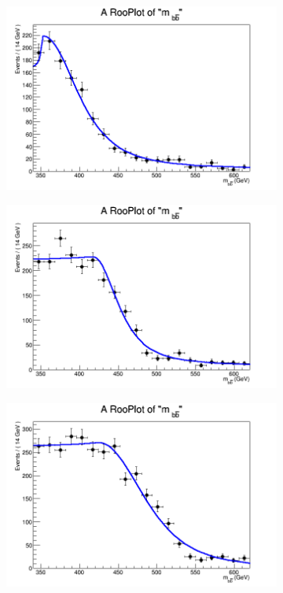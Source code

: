 \begin{figure}[phtb!]
  \begin{center}
  \begin{subfigure}[$m_{A}=400$ GeV]{0.4\textwidth}\includegraphics[width=\textwidth]{FitResults/images/fitMC_bAbb400_3.png}\end{subfigure}
  \begin{subfigure}[$m_{A}=450$ GeV]{0.4\textwidth}\includegraphics[width=\textwidth]{FitResults/images/fitMC_bAbb450_3.png}\end{subfigure}
  \begin{subfigure}[$m_{A}=500$ GeV]{0.4\textwidth}\includegraphics[width=\textwidth]{FitResults/images/fitMC_bAbb500_3.png}\end{subfigure}

\end{center}
\end{figure}
